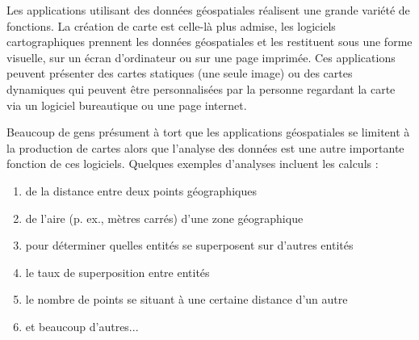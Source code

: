 Les applications utilisant des donn\'ees g\'eospatiales r\'ealisent une grande vari\'et\'e de fonctions. La cr\'eation de carte est celle-l\`a plus admise, les logiciels cartographiques prennent les donn\'ees g\'eospatiales et les restituent sous une forme visuelle, sur un \'ecran d'ordinateur ou sur une page imprim\'ee.
Ces applications peuvent pr\'esenter des cartes statiques (une seule image) ou des cartes dynamiques qui peuvent \^etre personnalis\'ees par la personne regardant la carte via un logiciel bureautique ou une page internet.

Beaucoup de gens pr\'esument \`a tort que les applications g\'eospatiales se limitent \`a la production de cartes alors que l'analyse des donn\'ees est une autre importante fonction de ces logiciels. Quelques exemples d'analyses incluent les calculs : 


\begin{enumerate} 
\item de la distance entre deux points g\'eographiques  
\item de l'aire (p. ex., m\`etres carr\'es) d'une zone g\'eographique 
\item pour d\'eterminer quelles entit\'es se superposent sur d'autres entit\'es 
\item le taux de superposition entre entit\'es 
\item le nombre de points se situant \`a une certaine distance d'un autre 
\item et beaucoup d'autres...
\end{enumerate} 

%

